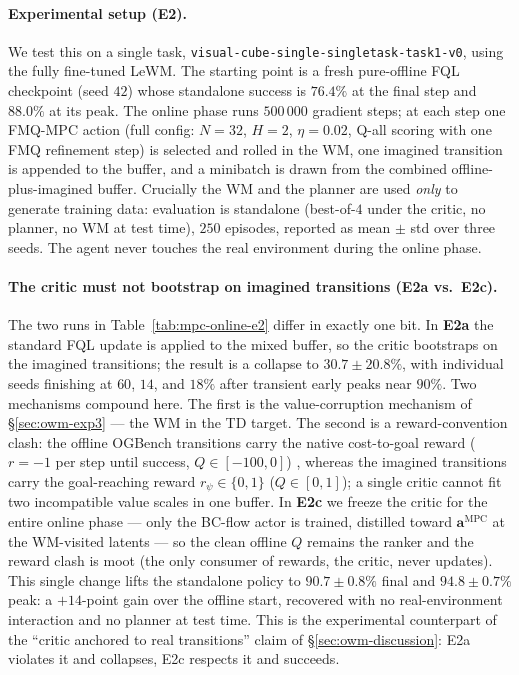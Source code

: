 \paragraph{Experimental setup (E2).}
We test this on a single task,
\texttt{visual-cube-single-singletask-task1-v0}, using the fully
fine-tuned LeWM. The starting point is a fresh pure-offline FQL
checkpoint (seed $42$) whose standalone success is $76.4\%$ at the final
step and $88.0\%$ at its peak. The online phase runs $500\,000$ gradient
steps; at each step one FMQ-MPC action (full config: $N = 32$, $H = 2$,
$\eta = 0.02$, Q-all scoring with one FMQ refinement step) is selected
and rolled in the WM, one imagined transition is appended to the buffer,
and a minibatch is drawn from the combined offline-plus-imagined buffer.
Crucially the WM and the planner are used \emph{only} to generate
training data: evaluation is standalone (best-of-$4$ under the critic,
no planner, no WM at test time), $250$ episodes, reported as
mean $\pm$ std over three seeds. The agent never touches the real
environment during the online phase.

\paragraph{The critic must not bootstrap on imagined transitions (E2a vs.\ E2c).}
The two runs in Table~\ref{tab:mpc-online-e2} differ in exactly one bit.
In \textbf{E2a} the standard FQL update is applied to the mixed buffer,
so the critic bootstraps on the imagined transitions; the result is a
collapse to $30.7 \pm 20.8\%$, with individual seeds finishing at $60$,
$14$, and $18\%$ after transient early peaks near $90\%$. Two mechanisms
compound here. The first is the value-corruption mechanism of
\S\ref{sec:owm-exp3} --- the WM in the TD target. The second is a
reward-convention clash: the offline OGBench transitions carry the
native cost-to-goal reward ($r = -1$ per step until success,
$Q \in [-100, 0]$) \cite{ogbench_park2025}, whereas the imagined
transitions carry the goal-reaching reward $r_\psi \in \{0, 1\}$
($Q \in [0, 1]$); a single critic cannot fit two incompatible value
scales in one buffer. In \textbf{E2c} we freeze the critic for the
entire online phase --- only the BC-flow actor is trained, distilled
toward $\mathbf{a}^{\text{MPC}}$ at the WM-visited latents --- so the
clean offline $Q$ remains the ranker and the reward clash is moot (the
only consumer of rewards, the critic, never updates). This single change
lifts the standalone policy to $90.7 \pm 0.8\%$ final and
$94.8 \pm 0.7\%$ peak: a $+14$-point gain over the offline start,
recovered with no real-environment interaction and no planner at test
time. This is the experimental counterpart of the
``critic anchored to real transitions'' claim of
\S\ref{sec:owm-discussion}: E2a violates it and collapses, E2c respects
it and succeeds.

